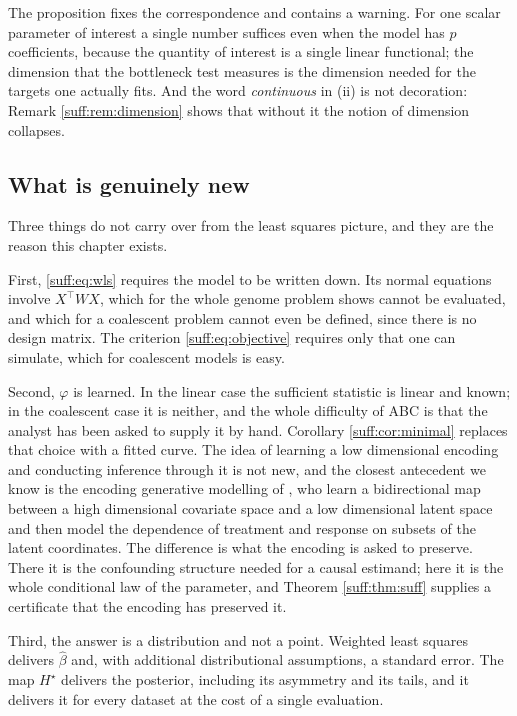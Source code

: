 The proposition fixes the correspondence and contains a warning. For one scalar parameter of
interest a single number suffices even when the model has $p$ coefficients, because the
quantity of interest is a single linear functional; the dimension that the bottleneck test
measures is the dimension needed for the targets one actually fits. And the word
\emph{continuous} in (ii) is not decoration: Remark \ref{suff:rem:dimension} shows that
without it the notion of dimension collapses.

\subsection{What is genuinely new}

Three things do not carry over from the least squares picture, and they are the reason this
chapter exists.

First, \eqref{suff:eq:wls} requires the model to be written down. Its normal equations involve
$X^\top WX$, which for the whole genome problem \citet{suff:ewens2024} shows cannot be
evaluated, and which for a coalescent problem cannot even be defined, since there is no
design matrix. The criterion \eqref{suff:eq:objective} requires only that one can simulate,
which for coalescent models is easy.

Second, $\varphi$ is learned. In the linear case the sufficient statistic is linear and known;
in the coalescent case it is neither, and the whole difficulty of ABC is that the analyst has
been asked to supply it by hand. Corollary \ref{suff:cor:minimal} replaces that choice with a
fitted curve. The idea of learning a low dimensional encoding and conducting inference through
it is not new, and the closest antecedent we know is the encoding generative modelling of
\citet{suff:liuchenwong2024}, who learn a bidirectional map between a high dimensional
covariate space and a low dimensional latent space and then model the dependence of treatment
and response on subsets of the latent coordinates. The difference is what the encoding is
asked to preserve. There it is the confounding structure needed for a causal estimand; here
it is the whole conditional law of the parameter, and Theorem \ref{suff:thm:suff} supplies a
certificate that the encoding has preserved it.

Third, the answer is a distribution and not a point. Weighted least squares delivers
$\hat\beta$ and, with additional distributional assumptions, a standard error. The map
$H^\star$ delivers the posterior, including its asymmetry and its tails, and it delivers it
for every dataset at the cost of a single evaluation.

